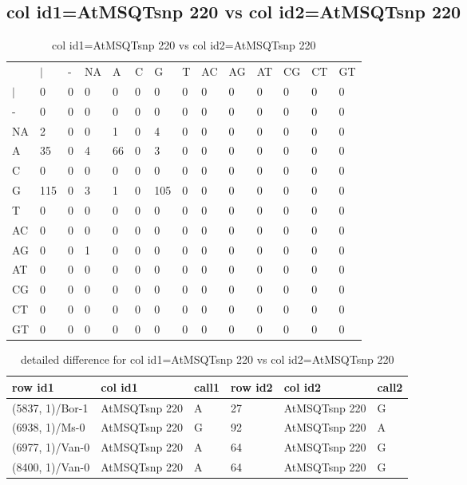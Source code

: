 \subsection{col id1=AtMSQTsnp 220 vs col id2=AtMSQTsnp 220}
\begin{center}
\begin{longtable}{|l|l|l|l|l|l|l|l|l|l|l|l|l|l|}
\caption{col id1=AtMSQTsnp 220 vs col id2=AtMSQTsnp 220} \label{table_dm778}\\
\hline
\\
\hline
&$|$&-&NA&A&C&G&T&AC&AG&AT&CG&CT&GT\\
$|$&0&0&0&0&0&0&0&0&0&0&0&0&0\\
-&0&0&0&0&0&0&0&0&0&0&0&0&0\\
NA&2&0&0&1&0&4&0&0&0&0&0&0&0\\
A&35&0&4&66&0&3&0&0&0&0&0&0&0\\
C&0&0&0&0&0&0&0&0&0&0&0&0&0\\
G&115&0&3&1&0&105&0&0&0&0&0&0&0\\
T&0&0&0&0&0&0&0&0&0&0&0&0&0\\
AC&0&0&0&0&0&0&0&0&0&0&0&0&0\\
AG&0&0&1&0&0&0&0&0&0&0&0&0&0\\
AT&0&0&0&0&0&0&0&0&0&0&0&0&0\\
CG&0&0&0&0&0&0&0&0&0&0&0&0&0\\
CT&0&0&0&0&0&0&0&0&0&0&0&0&0\\
GT&0&0&0&0&0&0&0&0&0&0&0&0&0\\
\hline
\end{longtable}
\end{center}

\begin{center}
\begin{longtable}{|l|l|l|l|l|l|}
\caption{detailed difference for col id1=AtMSQTsnp 220 vs col id2=AtMSQTsnp 220} \label{table_dm779}\\
\hline
row id1&col id1&call1&row id2&col id2&call2\\
\hline
(5837, 1)/Bor-1&AtMSQTsnp 220&A&27&AtMSQTsnp 220&G\\
(6938, 1)/Ms-0&AtMSQTsnp 220&G&92&AtMSQTsnp 220&A\\
(6977, 1)/Van-0&AtMSQTsnp 220&A&64&AtMSQTsnp 220&G\\
(8400, 1)/Van-0&AtMSQTsnp 220&A&64&AtMSQTsnp 220&G\\
\hline
\end{longtable}
\end{center}

